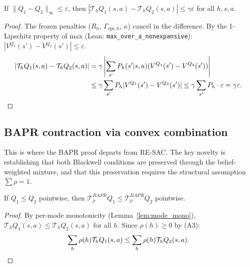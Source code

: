 \begin{lemma}
    \label{lem:mode_bound}
    If $\|Q_1 - Q_2\|_\infty \leq \varepsilon$, then $|\mathcal{T}_h Q_1(s,a) - \mathcal{T}_h Q_2(s,a)| \leq \gamma \varepsilon$ for all $h,s,a$.
\end{lemma}
\begin{proof}
The frozen penalties ($R_h$, $\Gamma_{\text{epi},h}$, $\kappa$) cancel in the difference. By the 1-Lipschitz property of max (Lean: \texttt{max\_over\_a\_nonexpansive}): $|V^{Q_1}(s') - V^{Q_2}(s')| \leq \varepsilon$.
\begin{align}
    |\mathcal{T}_h Q_1(s,a) - \mathcal{T}_h Q_2(s,a)| &= \gamma \left|\sum_{s'} P_h(s'|s,a)(V^{Q_1}(s') - V^{Q_2}(s'))\right| \notag \\
    &\leq \gamma \sum_{s'} P_h |V^{Q_1}(s') - V^{Q_2}(s')| \leq \gamma \sum_{s'} P_h \cdot \varepsilon = \gamma \varepsilon. \qedhere
\end{align}
\end{proof}


\subsection{BAPR contraction via convex combination}

This is where the BAPR proof departs from RE-SAC. The key novelty is establishing that both Blackwell conditions are preserved through the belief-weighted mixture, and that this preservation requires the structural assumption $\sum \rho = 1$.

\begin{lemma}
    \label{lem:bapr_mono}
    If $Q_1 \leq Q_2$ pointwise, then $\mathcal{T}^{BAPR}_\rho Q_1 \leq \mathcal{T}^{BAPR}_\rho Q_2$ pointwise.
\end{lemma}
\begin{proof}
By per-mode monotonicity (Lemma~\ref{lem:mode_mono}), $\mathcal{T}_h Q_1(s,a) \leq \mathcal{T}_h Q_2(s,a)$ for all $h$. Since $\rho(h) \geq 0$ by (A3):
\begin{equation}
    \sum_h \rho(h) \mathcal{T}_h Q_1(s,a) \leq \sum_h \rho(h) \mathcal{T}_h Q_2(s,a). \qedhere
\end{equation}
\end{proof}

